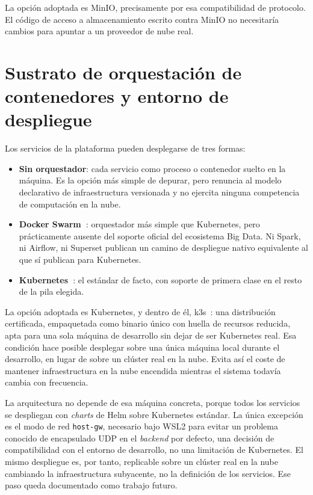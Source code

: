 La opción adoptada es MinIO, precisamente por esa compatibilidad de
protocolo. El código de acceso a almacenamiento escrito contra MinIO no
necesitaría cambios para apuntar a un proveedor de nube real.

\section{Sustrato de orquestación de contenedores y entorno de despliegue}
\label{sec:estado_arte_kubernetes}

Los servicios de la plataforma pueden desplegarse de tres formas:

\begin{itemize}
  \item \textbf{Sin orquestador}: cada servicio como proceso o contenedor
  suelto en la máquina. Es la opción más simple de depurar, pero renuncia
  al modelo declarativo de infraestructura versionada y no ejercita
  ninguna competencia de computación en la nube.
  \item \textbf{Docker Swarm~\cite{docker_swarm_docs}}: orquestador más
  simple que Kubernetes, pero prácticamente ausente del soporte oficial
  del ecosistema Big Data. Ni Spark, ni Airflow, ni Superset publican un
  camino de despliegue nativo equivalente al que sí publican para
  Kubernetes.
  \item \textbf{Kubernetes~\cite{cncf_kubernetes}}: el estándar de facto,
  con soporte de primera clase en el resto de la pila elegida.
\end{itemize}

La opción adoptada es Kubernetes, y dentro de él, k3s~\cite{k3s_docs}: una
distribución certificada, empaquetada como binario único con huella de
recursos reducida, apta para una sola máquina de desarrollo sin dejar de
ser Kubernetes real. Esa condición hace posible desplegar sobre una única
máquina local durante el desarrollo, en lugar de sobre un clúster real en
la nube. Evita así el coste de mantener infraestructura en la nube
encendida mientras el sistema todavía cambia con frecuencia.

La arquitectura no depende de esa máquina concreta, porque todos los
servicios se despliegan con \textit{charts} de Helm sobre Kubernetes
estándar. La única excepción es el modo de red \texttt{host-gw}, necesario
bajo WSL2 para evitar un problema conocido de encapsulado UDP en el
\textit{backend} por defecto, una decisión de compatibilidad con el
entorno de desarrollo, no una limitación de Kubernetes. El mismo
despliegue es, por tanto, replicable sobre un clúster real en la nube
cambiando la infraestructura subyacente, no la definición de los
servicios. Ese paso queda documentado como trabajo futuro.

